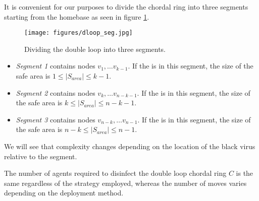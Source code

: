 It is convenient for our purposes  to  divide the chordal ring into  three segments starting from the homebase as seen in figure \ref{fig:dloop-seg}.  
\begin{figure}[H]
  \centering  
  \texttt{[image: figures/dloop\_seg.jpg]}
  \caption{Dividing the double loop into three segments.}\label{fig:dloop-seg}
\end{figure}



\begin{itemize}

\item  {\em Segment 1} contains nodes $v_1, \ldots v_{k-1}$.  If the \bv is in this segment, the size of the safe area is $1\leq |S_{area}| \leq k-1$.
\item  {\em Segment 2} contains nodes $v_k, \ldots v_{n-k-1}$.   If the \bv is in this segment, the size of the safe area is $k\leq |S_{area}| \leq n-k-1$.
\item  {\em  Segment 3}  contains nodes $v_{n-k}, \ldots v_{n-1}$.   If the \bv is in this segment, the size of the safe area is $n-k\leq |S_{area}| \leq n-1$.
\end{itemize}

We will see that complexity changes depending on the  location of the black virus relative to the segment. 

The number of agents required to disinfect the double loop chordal ring $C$ is the same regardless of the strategy employed, whereas the number of moves varies depending on the deployment method.
 





